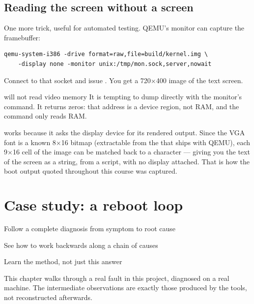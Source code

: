 \section{Reading the screen without a screen}

One more trick, useful for automated testing. QEMU's monitor can capture the framebuffer:

\begin{lstlisting}[style=sh]
qemu-system-i386 -drive format=raw,file=build/kernel.img \
    -display none -monitor unix:/tmp/mon.sock,server,nowait
\end{lstlisting}

Connect to that socket and issue . You get a 720$\times$400 image of
the text screen.

\begin{warn}{ will not read video memory}
It is tempting to dump  directly with the monitor's  command. It returns
zeros: that address is a device region, not RAM, and the command only reads RAM.

 works because it asks the display device for its rendered output. Since the VGA
font is a known 8$\times$16 bitmap (extractable from the \cod{vgabios.bin} that ships with QEMU),
each 9$\times$16 cell of the image can be matched back to a character --- giving you the text of the
screen as a string, from a script, with no display attached. That is how the boot output quoted
throughout this course was captured.
\end{warn}

\chapter{Case study: a reboot loop}

\begin{goals}
  \item Follow a complete diagnosis from symptom to root cause
  \item See how to work backwards along a chain of causes
  \item Learn the method, not just this answer
\end{goals}

This chapter walks through a real fault in this project, diagnosed on a real machine. The
intermediate observations are exactly those produced by the tools, not reconstructed afterwards.

